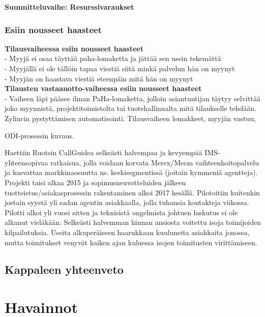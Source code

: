 \documentclass[finnish,12pt,a4paper,pdftex]{article}
\begin{document}
\textbf{Suunnitteluvaihe: Resurssivaraukset}\\



\subsubsection{Esiin nousseet haasteet}
\textbf{Tilausvaiheessa esiin nousseet haasteet}\\

- Myyjä ei osaa täyttää paha-lomaketta ja jättää sen usein tekemättä\\
- Myyjällä ei ole tällöin tapaa viestiä siitä minkä palvelun hän on myynyt\\
- Myyjän on haastava viestiä eteenpäin mitä hän on myynyt\\

\textbf{Tilausten vastaanotto-vaiheessa esiin nousseet haasteet}\\

- Vaiheen läpi pääsee ilman PaHa-lomaketta, jolloin asiantuntijan täytyy selvittää joko myynnistä, projektitoimistolta tai tuotehallinnalta mitä tilaukselle tehdään.\\

Zylincin pystyttämisen automatisointi. Tilausvaiheen lomakkeet, myyjän vastuu, 

ODI-prosessin kuvaus.

Haettiin Ruotsin CallGuidea selkeästi halvempaa ja kevyempää IMS-yhteensopivaa ratkaisua, jolla voidaan korvata Merex/Mecm vaihteenhoitopalvelu ja kasvattaa markkinaosuutta ns. keskisegmentissä (joitain kymmeniä agentteja). Projekti taisi alkaa 2015 ja sopimusneuvotteluiden jälkeen tuotteistus/asiakasprosessin rakentaminen alkoi 2017 kesällä. Pilotoitiin kuitenkin jostain syystä yli sadan agentin asiakkaalla, jolla tuhansia kontakteja viikossa. Pilotti alkoi yli vuosi sitten ja teknisistä ongelmista johtuen laskutus ei ole alkanut vieläkään. Selkeästi halvemman hinnan ansiosta voitettu isoja toimijoiden kilpailutuksia. Useita alkuperäiseen haarukkaan kuuluneita asiakkaita jonossa, mutta toimitukset venyvät kaiken ajan kuluessa isojen toimitusten virittämiseen.

\subsection{Kappaleen yhteenveto}


\clearpage

\section{Havainnot}
\end{document}
